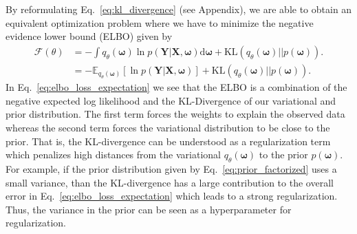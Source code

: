 \documentclass[runningheads]{llncs}
\begin{document}
By reformulating Eq.~\ref{eq:kl_divergence} (see Appendix), we are able to obtain an equivalent optimization problem where we have to minimize the negative evidence lower bound (ELBO) given by
\begin{align}
    \mathcal{F}(\theta) &= - \int q_\theta(\boldsymbol{\omega}) \ln p \left(\mathbf{Y} | \mathbf{X}, \boldsymbol{\omega}\right) \text{d}\boldsymbol{\omega} +
    \text{KL}\left(q_\theta(\boldsymbol{\omega}) || p(\boldsymbol{\omega}) \right). \label{eq:elbo} 
    \\
    &= - \mathbb{E}_{q_\theta(\boldsymbol{\omega})}\left[ \ln p \left(\mathbf{Y} | \mathbf{X}, \boldsymbol{\omega}\right)\right] +
    \text{KL}\left(q_\theta(\boldsymbol{\omega}) || p(\boldsymbol{\omega}) \right). \label{eq:elbo_loss_expectation}
\end{align}
In Eq.~\ref{eq:elbo_loss_expectation} we see that the ELBO is a combination of the negative expected log likelihood and the KL-Divergence of our variational and prior distribution.
The first term forces the weights to explain the observed data whereas the second term forces the variational distribution to be close to the prior. 
That is, the KL-divergence can be understood as a regularization term which penalizes high distances from the variational $q_\theta(\boldsymbol{\omega})$ to the prior $p(\boldsymbol{\omega})$.
For example, if the prior distribution given by Eq.~\ref{eq:prior_factorized} uses a small variance, than the KL-divergence has a large contribution to the overall error in Eq.~\ref{eq:elbo_loss_expectation} which leads to a strong regularization. 
Thus, the variance in the prior can be seen as a hyperparameter for regularization.
\end{document}
